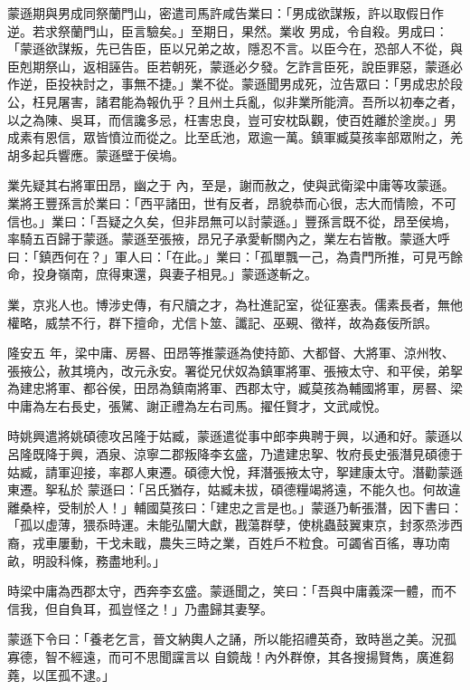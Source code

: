 \begin{pinyinscope}
 蒙遜期與男成同祭蘭門山，密遣司馬許咸告業曰：「男成欲謀叛，許以取假日作逆。若求祭蘭門山，臣言驗矣。」至期日，果然。業收
 男成，令自殺。男成曰：「蒙遜欲謀叛，先已告臣，臣以兄弟之故，隱忍不言。以臣今在，恐部人不從，與臣剋期祭山，返相誣告。臣若朝死，蒙遜必夕發。乞詐言臣死，說臣罪惡，蒙遜必作逆，臣投袂討之，事無不捷。」業不從。蒙遜聞男成死，泣告眾曰：「男成忠於段公，枉見屠害，諸君能為報仇乎？且州土兵亂，似非業所能濟。吾所以初奉之者，以之為陳、吳耳，而信讒多忌，枉害忠良，豈可安枕臥觀，使百姓離於塗炭。」男成素有恩信，眾皆憤泣而從之。比至氐池，眾逾一萬。鎮軍臧莫孩率部眾附之，羌胡多起兵響應。蒙遜壁于侯塢。



 業先疑其右將軍田昂，幽之于
 內，至是，謝而赦之，使與武衛梁中庸等攻蒙遜。業將王豐孫言於業曰：「西平諸田，世有反者，昂貌恭而心很，志大而情險，不可信也。」業曰：「吾疑之久矣，但非昂無可以討蒙遜。」豐孫言既不從，昂至侯塢，率騎五百歸于蒙遜。蒙遜至張掖，昂兄子承愛斬關內之，業左右皆散。蒙遜大呼曰：「鎮西何在？」軍人曰：「在此。」業曰：「孤單飄一己，為貴門所推，可見丐餘命，投身嶺南，庶得東還，與妻子相見。」蒙遜遂斬之。



 業，京兆人也。博涉史傳，有尺牘之才，為杜進記室，從征塞表。儒素長者，無他權略，威禁不行，群下擅命，尤信卜筮、讖記、巫覡、徵祥，故為姦佞所誤。



 隆安五
 年，梁中庸、房晷、田昂等推蒙遜為使持節、大都督、大將軍、涼州牧、張掖公，赦其境內，改元永安。署從兄伏奴為鎮軍將軍、張掖太守、和平侯，弟挐為建忠將軍、都谷侯，田昂為鎮南將軍、西郡太守，臧莫孩為輔國將軍，房晷、梁中庸為左右長史，張騭、謝正禮為左右司馬。擢任賢才，文武咸悅。



 時姚興遣將姚碩德攻呂隆于姑臧，蒙遜遣從事中郎李典聘于興，以通和好。蒙遜以呂隆既降于興，酒泉、涼寧二郡叛降李玄盛，乃遣建忠挐、牧府長史張潛見碩德于姑臧，請軍迎接，率郡人東遷。碩德大悅，拜潛張掖太守，挐建康太守。潛勸蒙遜東遷。挐私於
 蒙遜曰：「呂氏猶存，姑臧未拔，碩德糧竭將遠，不能久也。何故違離桑梓，受制於人！」輔國莫孩曰：「建忠之言是也。」蒙遜乃斬張潛，因下書曰：「孤以虛薄，猥忝時運。未能弘闡大獻，戡蕩群孽，使桃蟲鼓翼東京，封豕烝涉西裔，戎車屢動，干戈未戢，農失三時之業，百姓戶不粒食。可蠲省百徭，專功南畝，明設科條，務盡地利。」



 時梁中庸為西郡太守，西奔李玄盛。蒙遜聞之，笑曰：「吾與中庸義深一體，而不信我，但自負耳，孤豈怪之！」乃盡歸其妻孥。



 蒙遜下令曰：「養老乞言，晉文納輿人之誦，所以能招禮英奇，致時邕之美。況孤寡德，智不經遠，而可不思聞讜言以
 自鏡哉！內外群僚，其各搜揚賢雋，廣進芻蕘，以匡孤不逮。」




\end{pinyinscope}
